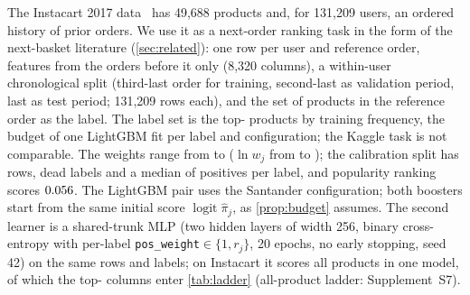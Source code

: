 \documentclass[sigconf,nonacm]{acmart}
\newcommand{\Supp}[1]{Supplement~#1}  %
\begin{document}
The Instacart 2017 data~\cite{Instacart2017} has 49,688 products and, for 131,209 users, an ordered history of prior orders. We use it as a next-order ranking task in the form of the next-basket literature (\cref{sec:related}): one row per user and reference order, features from the orders before it only (8,320 columns), a within-user chronological split (third-last order for training, second-last as validation period, last as test period; 131,209 rows each), and the set of products in the reference order as the label. The label set is the top-\nInLabels{} products by training frequency, the budget of one LightGBM fit per label and configuration; the Kaggle task is not comparable. The weights range from \nIwMin{} to \nIwMax{} ($\ln w_j$ from \nIlnwMin{} to \nIlnwMax); the calibration split has \nInVal{} rows, \nISnDead{} dead labels and a median of \nIcalPosMedAlive{} positives per label, and popularity ranking scores $0.056$. The LightGBM pair uses the Santander configuration; both boosters start from the same initial score $\operatorname{logit}\hat\pi_j$, as \cref{prop:budget} assumes. The second learner is a shared-trunk MLP (two hidden layers of width 256, binary cross-entropy with per-label \texttt{pos\_weight}$\in\{1,r_j\}$, 20 epochs, no early stopping, seed 42) on the same rows and labels; on Instacart it scores all \nIMAnLabels{} products in one model, of which the top-\nInLabels{} columns enter \cref{tab:ladder} (all-product ladder: \Supp{S7}).
\end{document}
